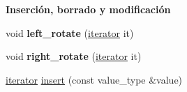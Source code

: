 \begin{Indent}{\bf \-Inserción, borrado y modificación}
\begin{DoxyCompactItemize}
\item 
\hypertarget{classaed2_1_1map_a1f4b383ece3e22680802d27aa11b623a}{void {\bfseries left\-\_\-rotate} (\hyperlink{classaed2_1_1map_1_1iterator}{iterator} it)}\label{classaed2_1_1map_a1f4b383ece3e22680802d27aa11b623a}

\item 
\hypertarget{classaed2_1_1map_af339eb8e0af78bc07ad55ddd97938ee7}{void {\bfseries right\-\_\-rotate} (\hyperlink{classaed2_1_1map_1_1iterator}{iterator} it)}\label{classaed2_1_1map_af339eb8e0af78bc07ad55ddd97938ee7}

\item 
\hyperlink{classaed2_1_1map_1_1iterator}{iterator} \hyperlink{classaed2_1_1map_a60aacba06b1579630b3c8e996cf248c8}{insert} (const value\-\_\-type \&value)
\end{DoxyCompactItemize}
\end{Indent}
